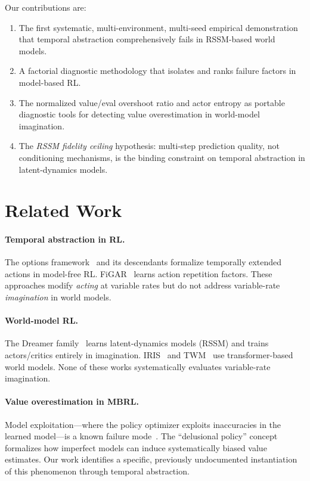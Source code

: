 \documentclass[10pt,letterpaper]{article}
\begin{document}
Our contributions are:
\begin{enumerate}[nosep]
  \item The first systematic, multi-environment, multi-seed empirical demonstration that temporal abstraction comprehensively fails in RSSM-based world models.
  \item A factorial diagnostic methodology that isolates and ranks failure factors in model-based RL.
  \item The normalized value/eval overshoot ratio and actor entropy as portable diagnostic tools for detecting value overestimation in world-model imagination.
  \item The \emph{RSSM fidelity ceiling} hypothesis: multi-step prediction quality, not conditioning mechanisms, is the binding constraint on temporal abstraction in latent-dynamics models.
\end{enumerate}

\section{Related Work}\label{sec:related}

\paragraph{Temporal abstraction in RL.}
The options framework~\citep{sutton1999options} and its descendants formalize temporally extended actions in model-free RL.
FiGAR~\citep{sharma2017figar} learns action repetition factors.
These approaches modify \emph{acting} at variable rates but do not address variable-rate \emph{imagination} in world models.

\paragraph{World-model RL.}
The Dreamer family~\citep{hafner2020dream,hafner2021mastering,hafner2023dreamerv3} learns latent-dynamics models (RSSM) and trains actors/critics entirely in imagination.
IRIS~\citep{micheli2023iris} and TWM~\citep{robine2023twm} use transformer-based world models.
None of these works systematically evaluates variable-rate imagination.

\paragraph{Value overestimation in MBRL.}
Model exploitation---where the policy optimizer exploits inaccuracies in the learned model---is a known failure mode~\citep{janner2019mbpo}.
The ``delusional policy'' concept~\citep{delalleau2019delusional} formalizes how imperfect models can induce systematically biased value estimates.
Our work identifies a specific, previously undocumented instantiation of this phenomenon through temporal abstraction.
\end{document}
